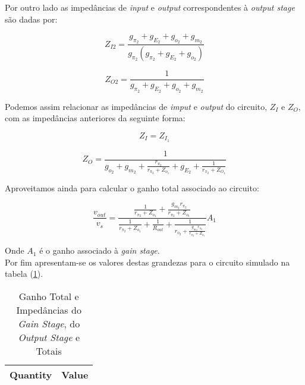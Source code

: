 Por outro lado as impedâncias de \emph{input} e \emph{output} correspondentes à \emph{output stage} são dadas por:

\begin{equation}
  Z_{I2} = \frac{g_{\pi_2} + g_{E_2} + g_{o_2} + g_{m_2}}{g_{\pi_2}(g_{\pi_2} + g_{E_2} + g_{o_2})}
\end{equation}

\begin{equation}
  Z_{O2} = \frac{1}{g_{\pi_2} + g_{E_2} + g_{o_2} + g_{m_2}}
\end{equation}

Podemos assim relacionar as impedâncias de \emph{imput} e \emph{output} do circuito, $Z_I$ e $Z_O$, com as impedâncias anteriores
da seguinte forma:

\begin{equation}
  Z_I = Z_{I_1}
\end{equation}

\begin{equation}
  Z_O = \frac{1}{g_{o_2} + g_{m_2} + \frac{r_{\pi_2}}{r_{\pi_2} + Z_{o_1}} + g_{E_2} + \frac{1}{r_{\pi_2} + Z_{O_1}}}
\end{equation}

Aproveitamos ainda para calcular o ganho total associado ao circuito:

\begin{equation}
  \frac{v_{out}}{v_{s}} = \frac{\frac{1}{r_{\pi_2} + Z_{o_1}} + \frac{g_{m_2} r_{\pi_2}}{r_{\pi_2} + Z_{o_1}}}{\frac{1}{r_{\pi_2} + Z_{o_1}} + \frac{1}{R_{out}} + \frac{1}{r_{o_2} + \frac{g_{m_2} r_{\pi_2}}{r_{\pi_2} + Z_{o_1}}} } A_1
\end{equation}

Onde $A_1$ é o ganho associado à \emph{gain stage}. \\
Por fim apresentam-se os valores destas grandezas para o circuito simulado na tabela (\ref{tab:Teo-Impedancias}).

\begin{table}[H]
    \centering
    \begin{tabular}{|l|r|}
    \hline    
    {\bf Quantity} & {\bf Value} \\ \hline
    
    \end{tabular}
    \caption{Ganho Total e Impedâncias do \emph{Gain Stage}, do \emph{Output Stage} e Totais}
    \label{tab:Teo-Impedancias}
\end{table}

